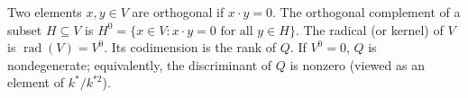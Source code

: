 Two elements $x, y \in V$ are orthogonal if $x \cdot y = 0$. The orthogonal complement of a subset $H \subseteq V$ is $H^0 = \{x \in V : x \cdot y = 0 \text{ for all } y \in H\}$. The radical (or kernel) of $V$ is $\operatorname{rad}(V) = V^0$. Its codimension is the rank of $Q$. If $V^0 = 0$, $Q$ is nondegenerate; equivalently, the discriminant of $Q$ is nonzero (viewed as an element of $k^*/k^{*2}$).
